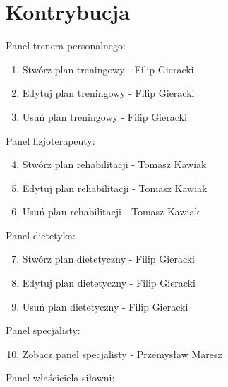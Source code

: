 \section{Kontrybucja}\label{sec:kontrybucja}

{Panel trenera personalnego:}

\begin{enumerate}
\tightlist
\item
  {Stwórz plan treningowy - Filip Gieracki}
\item
  {Edytuj plan treningowy - Filip Gieracki}
\item
  {Usuń plan treningowy - Filip Gieracki}
\end{enumerate}

{Panel fizjoterapeuty:}

\begin{enumerate}
\setcounter{enumi}{3}
\tightlist
\item
  {Stwórz plan rehabilitacji - Tomasz Kawiak}
\item
  {Edytuj plan rehabilitacji - Tomasz Kawiak}
\item
  {Usuń plan rehabilitacji - Tomasz Kawiak}
\end{enumerate}

{Panel dietetyka:}

\begin{enumerate}
\setcounter{enumi}{6}
\tightlist
\item
  {Stwórz plan dietetyczny - Filip Gieracki}
\item
  {Edytuj plan dietetyczny - Filip Gieracki}
\item
  {Usuń plan dietetyczny - Filip Gieracki}
\end{enumerate}

{Panel specjalisty:}

\begin{enumerate}
\setcounter{enumi}{9}
\tightlist
\item
  {Zobacz panel specjalisty - Przemysław Maresz}
\end{enumerate}

{Panel właściciela siłowni:}

